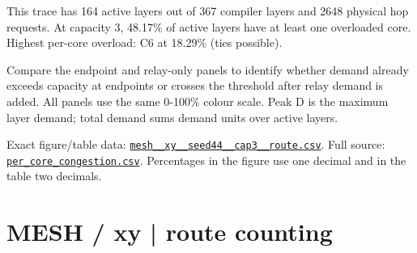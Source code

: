\documentclass[10pt,a4paper]{article}
\begin{document}
This trace has 164 active layers out of 367 compiler layers and 2648 physical hop requests. At capacity 3, 48.17\% of active layers have at least one overloaded core. Highest per-core overload: C6 at 18.29\% (ties possible).\par
Compare the endpoint and relay-only panels to identify whether demand already exceeds capacity at endpoints or crosses the threshold after relay demand is added. All panels use the same 0-100\% colour scale. Peak D is the maximum layer demand; total demand sums demand units over active layers.\par
Exact figure/table data: \href{\detokenize{file:///home/dhruv-pansuriya/Documents/BTP/Compiler-Driven-ACE/output/pdf/qaoa_methods_congestion/tables/mesh__xy__seed44__cap3__route.csv}}{\nolinkurl{mesh__xy__seed44__cap3__route.csv}}. Full source: \href{\detokenize{file:///home/dhruv-pansuriya/Documents/BTP/Compiler-Driven-ACE/results/qaoa_2seed_2026-10-26/congestion/per_core_congestion.csv}}{\nolinkurl{per_core_congestion.csv}}. Percentages in the figure use one decimal and in the table two decimals.\par
\clearpage
\section*{MESH / xy | route counting}
\end{document}
